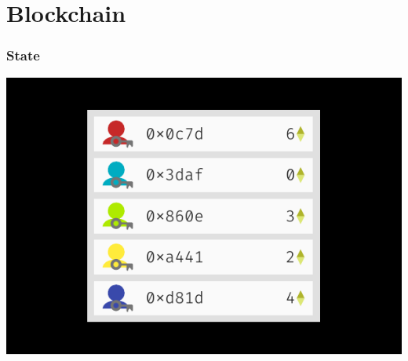 \documentclass[xcolor=x11names,compress]{beamer}
\begin{document}
\section{Blockchain}
\begin{frame}
	\frametitle{State}
	\begin{center}
		\includegraphics[width=\textwidth,height=0.8\textheight,keepaspectratio]{img/state/01.pdf}
	\end{center}
\end{frame}
\end{document}
